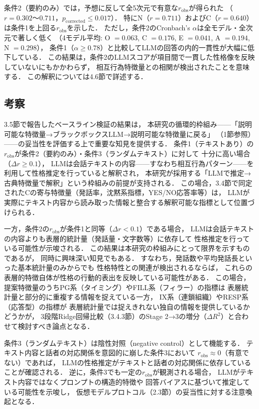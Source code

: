 \documentclass[dvipdfmx,11pt,a4paper]{bxjsarticle}
\renewcommand{\_}{\paperorigunderscore\allowbreak}%
\begin{document}
条件2（要約のみ）では，予想に反して全5次元で有意な$r_{\text{obs}}$が得られた
（$r = 0.302$〜$0.711$，$p_{\text{corrected}} \leq 0.017$）．
特にN（$r = 0.711$）およびC（$r = 0.640$）は条件1を上回る$r_{\text{obs}}$を示した．
ただし，条件2のCronbach's $\alpha$は全モデル・全次元で著しく低く
（4モデル平均: O $= 0.063$, C $= 0.176$, E $= 0.041$, A $= 0.194$, N $= 0.298$），
条件1（$\alpha \geq 0.78$）と比較してLLMの回答の内的一貫性が大幅に低下している．
この結果は，条件2のLLMスコアが項目間で一貫した性格像を反映していないにもかかわらず，
相互行為特徴量との相関が検出されたことを意味する．
この解釈については4.6節で詳述する．

\subsection{考察}
\label{sec:discuss_baseline}


3.5節で報告したベースライン検証の結果は，
本研究の循環的枠組み——「説明可能な特徴量→ブラックボックスLLM→説明可能な特徴量に戻る」
（1節参照）——の妥当性を評価する上で重要な知見を提供する．
条件1（テキストあり）の$r_{\text{obs}}$が条件2（要約のみ）・条件3（ランダムテキスト）に対して
十分に高い場合（$\Delta r \geq 0.1$），
LLMは会話テキストの内容——すなわち相互行為パターン——を利用して性格推定を行っていると解釈され，
本研究が採用する「LLMで推定→古典特徴量で解釈」という枠組みの前提が支持される．
この場合，3.4節で同定されたCの寄与特徴量（発話率，沈黙系指標，YES/NO応答率等）は，
LLMが実際にテキスト内容から読み取った情報と整合する解釈可能な指標として位置づけられる．

一方，条件2の$r_{\text{obs}}$が条件1と同等（$\Delta r < 0.1$）である場合，
LLMは会話テキストの内容よりも表層的統計量（発話量・文字数等）に依存して
性格推定を行っている可能性が示唆される．
この結果は本研究の枠組みにとって限界を示すものであるが，
同時に興味深い知見でもある．
すなわち，発話数や平均発話長といった基本統計量のみからでも
性格特性との関連が検出されるならば，
これらの表層的特徴自体が性格の行動的表出を反映している可能性がある．
この場合，提案特徴量のうちPG系（タイミング）やFILL系（フィラー）の指標は
表層統計量と部分的に重複する情報を捉えている一方，
IX系（連鎖組織）やRESP系（応答型）の指標が
表層統計量では捉えきれない独自の情報を提供しているかどうかが，
3段階Ridge回帰比較（3.4.3節）のStage 2→3の増分（$\Delta R^2$）と合わせて検討すべき論点となる．

条件3（ランダムテキスト）は陰性対照（negative control）として機能する．
テキスト内容と話者の対応関係を意図的に崩した条件3において
$r_{\text{obs}} \approx 0$（有意でない）であれば，
LLMの性格推定がテキストと話者の対応関係に依存していることが確認される．
逆に，条件3でも一定の$r_{\text{obs}}$が観測される場合，
LLMがテキスト内容ではなくプロンプトの構造的特徴や
回答バイアスに基づいて推定している可能性を示唆し，
仮想モデルプロトコル（2.3節）の妥当性に対する注意喚起となる．
\end{document}
